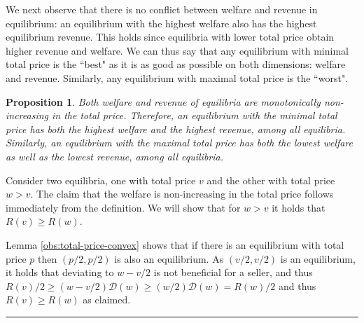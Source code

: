 \documentclass[11pt,a4paper]{article}
\newcommand{\qed}{\rule{1.5mm}{2mm}\vspace{0.1in}}
\newenvironment{proof}{\par\noindent{\bf Proof:}}{\qed}
\newtheorem{proposition}[theorem]{Proposition}
\begin{document}
We next observe that there is no conflict between welfare and revenue in equilibrium:
an equilibrium with the highest welfare also has the highest equilibrium revenue. This holds
since
equilibria with lower total price obtain higher revenue and welfare.
We can thus say that any equilibrium with minimal total price is the ``best" as it is as good as possible on both dimensions: welfare and revenue. Similarly,  any equilibrium with maximal total price is the ``worst".
\begin{proposition}
\label{obs:best-NE-well-defined}
	Both welfare and revenue of equilibria are monotonically non-increasing in the total price.
	Therefore, an equilibrium with the minimal total price has both the highest welfare and the highest revenue, among all equilibria.
	Similarly, an equilibrium with the maximal total price has both the lowest welfare as well as the lowest revenue, among all equilibria.
\end{proposition}
\begin{proof}
	Consider two equilibria, one with total price $v$ and the other with total price $w>v$. The claim that the welfare is non-increasing in the total price follows immediately from the definition.
We will show that for $w>v$ it holds that $R(v)\geq R(w)$.
	
	
	Lemma \ref{obs:total-price-convex} shows that if there is an equilibrium with total price $p$ then $(p/2,p/2)$ is also an equilibrium. As $(v/2,v/2)$ is an equilibrium, it holds that deviating to $w-v/2$ is not beneficial for a seller, and thus
	$R(v)/2\geq (w-v/2)\mathcal{D}(w)\geq (w/2) \mathcal{D}(w)= R(w)/2$ and thus $R(v)\geq R(w)$ as claimed.
\end{proof}
\end{document}
